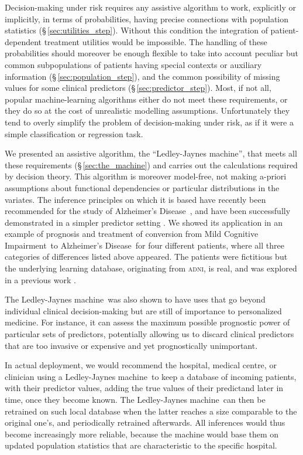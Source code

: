 \documentclass[utf8]{FrontiersinHarvard_mod} %
\newcommand*{\sect}{\S}%
\renewcommand*{\|}[1][]{\nonscript\:#1\vert\nonscript\:\mathopen{}}
\newcommand*{\ad}{Alzheimer's Disease}
\newcommand*{\mci}{Mild Cognitive Impairment}
\newcommand*{\ljm}{Ledley-Jaynes machine}
\newcommand*{\adni}{\textsc{adni}}
\begin{document}
Decision-making under risk requires any assistive algorithm to work, explicitly or implicitly, in terms of probabilities, having precise connections with population statistics (\sect\,\ref{sec:utilities_step}). Without this condition the integration of patient-dependent treatment utilities would be impossible. The handling of these probabilities should moreover be enough flexible to take into account peculiar but common subpopulations of patients having special contexts or auxiliary information (\sect\,\ref{sec:population_step}), and the common possibility of missing values for some clinical predictors (\sect\,\ref{sec:predictor_step}). Most, if not all, popular machine-learning algorithms either do not meet these requirements, or they do so at the cost of unrealistic modelling assumptions. Unfortunately they tend to overly simplify the problem of decision-making under risk, as if it were a simple classification or regression task.

We presented an assistive algorithm, the \enquote{\ljm}, that meets all these requirements (\sect\,\ref{sec:the_machine}) and carries out the calculations required by decision theory. This algorithm is moreover model-free, not making a-priori assumptions about functional dependencies or particular distributions in the variates. The inference principles on which it is based have recently been recommended for the study of \ad\ \citetext{\citealp{tempetal2021}; see also \citealp{asa2016,asa2019}}, and have been successfully demonstrated in a simpler predictor setting \citep{antonianovillalobosetal2014}. We showed its application in an example of prognosis and treatment of conversion from \mci\ to \ad\ for four different patients, where all three categories of differences listed above appeared. The patients were fictitious but the underlying learning database, originating from \adni, is real, and was explored in a previous work \citep{ryeetal2022}.

The \ljm\ was also shown to have uses that go beyond individual clinical decision-making but are still of importance to personalized medicine. For instance, it can assess the maximum possible prognostic power of particular sets of predictors, potentially allowing us to discard clinical predictors that are too invasive or expensive and yet prognostically unimportant.

In actual deployment, we would recommend the hospital, medical centre, or clinician using a \ljm\ to keep a database of incoming patients, with their predictor values, adding the true values of their predictand later in time, once they become known. The \ljm\ can then be retrained on such local database when the latter reaches a size comparable to the original one's, and periodically retrained afterwards. All inferences would thus become increasingly more reliable, because the machine would base them on updated population statistics that are characteristic to the specific hospital.
\end{document}
